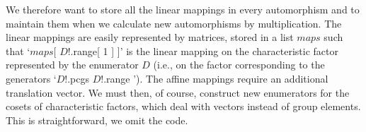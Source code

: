 We therefore want to store all the  linear mappings in every automorphism
and   to   maintain   them when  we     calculate  new  automorphisms  by
multiplication. The linear mappings  are easily represented by  matrices,
stored in a list  $maps$  such that `$maps$[  $D$!.range[  1 ] ]' is  the
linear mapping on the characteristic factor represented by the enumerator
$D$  (i.e.,  on the  factor corresponding  to the  generators `$D$!.pcgs{
$D$!.range  }'). The  affine  mappings require an additional  translation
vector. We must then, of course, construct new enumerators for the cosets
of  characteristic factors, which  deal   with vectors instead  of  group
elements. This is straightforward, we omit the code.

